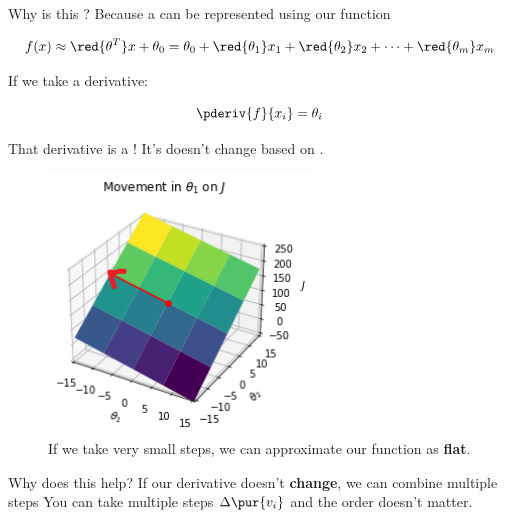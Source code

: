         \begin{clarification}
            Why is this ? Because a  can be represented using our  function 
            
            \begin{equation*}
                f(x) 
                \approx
                \red{\theta^T}x+\theta_0
                =
                \theta_0 + \red{\theta_1}x_1+\red{\theta_2}x_2+\dots+ \red{\theta_m}x_m
            \end{equation*}
            
            If we take a derivative:
            
            \begin{equation*}
                \pderiv{f}{x_i}
                =
                \theta_i
            \end{equation*}
            
            That derivative is a ! It's doesn't change based on .
        \end{clarification}
        
        \begin{figure}[H]
            \centering
                \includegraphics[width=70mm,scale=0.5]{images/gradient_descent_images/theta1_movement_plane.png}
            \caption*{If we take very small steps, we can approximate our function as \textbf{flat}.}
        \end{figure}
        
        
        Why does this help? If our derivative doesn't \textbf{change}, we can combine multiple steps  You can take multiple steps $\Delta \pur{v_i}$ and the order doesn't matter.
            
